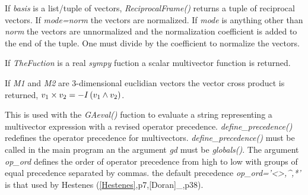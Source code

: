 \documentclass[letterpaper,10pt,english]{sphinxmanual}
\begin{document}

\begin{fulllineitems}
\label{GA:ReciprocalFrame}
If \emph{basis} is a list/tuple of vectors, \emph{ReciprocalFrame()} returns a tuple of reciprocal
vectors.  If \emph{mode=norm} the vectors are normalized.  If \emph{mode} is anything other than
\emph{norm} the vectors are unnormalized and the normalization coefficient is added to the
end of the tuple.  One must divide by the coefficient to normalize the vectors.

\end{fulllineitems}


\begin{fulllineitems}
\label{GA:ScalarFunction}
If \emph{TheFuction} is a real \emph{sympy} fuction a scalar multivector function is returned.

\end{fulllineitems}


\begin{fulllineitems}
\label{GA:cross}
If \emph{M1} and \emph{M2} are 3-dimensional euclidian vectors the vector cross product is
returned, $v_{1}\times v_{2} = -I\left ( {v_{1}\wedge v_{2}} \right )$.

\end{fulllineitems}


\begin{fulllineitems}
This is used with the \emph{GAeval()} fuction to evaluate a string representing a multivector
expression with a revised operator precedence.  \emph{define\_precedence()} redefines the operator
precedence for multivectors. \emph{define\_precedence()} must be called in the main program an the
argument \emph{gd} must be \emph{globals()}.  The argument \emph{op\_ord} defines the order of operator
precedence from high to low with groups of equal precedence separated by commas. the default
precedence \emph{op\_ord='\textless{}\textgreater{}\textbar{},\textasciicircum{},*'} is that used by Hestenes ({\hyperref[GA:hestenes]{{[}Hestenes{]}}},p7,{[}Doran{]}\_,p38).

\end{fulllineitems}
\end{document}
